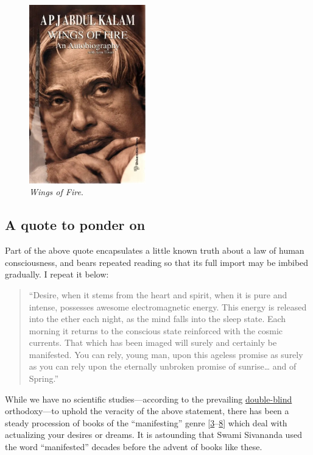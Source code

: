 \documentclass[
  a4paper,
]{article}
\begin{document}
\begin{figure}
\centering
\includegraphics[width=0.45\textwidth,height=\textheight]{images/Wings-of-Fire.jpg}
\caption{\emph{Wings of Fire}.}
\end{figure}

\hypertarget{a-quote-to-ponder-on}{%
\subsection{A quote to ponder on}\label{a-quote-to-ponder-on}}

Part of the above quote encapsulates a little known truth about a law of
human consciousness, and bears repeated reading so that its full import
may be imbibed gradually. I repeat it below:

\begin{quote}
``Desire, when it stems from the heart and spirit, when it is pure and
intense, possesses awesome electromagnetic energy. This energy is
released into the ether each night, as the mind falls into the sleep
state. Each morning it returns to the conscious state reinforced with
the cosmic currents. That which has been imaged will surely and
certainly be manifested. You can rely, young man, upon this ageless
promise as surely as you can rely upon the eternally unbroken promise of
sunrise\ldots{} and of Spring.''
\end{quote}

While we have no scientific studies---according to the prevailing
\href{https://dictionary.cambridge.org/dictionary/english/double-blind}{double-blind}
orthodoxy---to uphold the veracity of the above statement, there has
been a steady procession of books of the ``manifesting'' genre
{[}\protect\hyperlink{ref-murphy2006}{3}--\protect\hyperlink{ref-ferraro2021}{8}{]}
which deal with actualizing your desires or dreams. It is astounding
that Swami Sivananda used the word ``manifested'' decades before the
advent of books like these.
\end{document}
